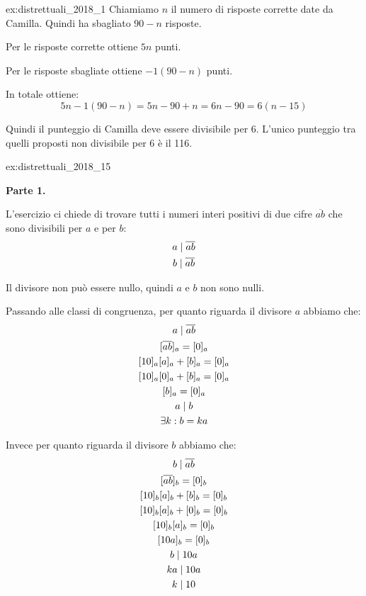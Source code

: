 \begin{soluzione}{ex:distrettuali_2018_1}
    Chiamiamo $n$ il numero di risposte corrette date da Camilla.
    Quindi ha sbagliato $90 - n$ risposte.

    Per le risposte corrette ottiene $5n$ punti.

    Per le risposte sbagliate ottiene $-1(90-n)$ punti.

    In totale ottiene:
    \[
        5n - 1(90 - n) = 5n - 90 + n = 6n - 90 = 6(n - 15)
    \]

    Quindi il punteggio di Camilla deve essere divisibile per 6.
    L'unico punteggio tra quelli proposti non divisibile per 6 è il 116.
\end{soluzione}

\begin{soluzione}{ex:distrettuali_2018_15}

    \textbf{Parte 1.}

    L'esercizio ci chiede di trovare tutti i numeri interi positivi di due cifre $\overline{ab}$ che sono divisibili
    per $a$ e per $b$:
    \begin{gather*}
        a  \mid  \overline{ab} \\
        b  \mid  \overline{ab}
    \end{gather*}

    Il divisore non può essere nullo, quindi $a$ e $b$ non sono nulli.

    Passando alle classi di congruenza, per quanto riguarda il divisore $a$ abbiamo che:
    \begin{gather*}
        a  \mid  \overline{ab} \\
        [\overline{ab}]_a = [0]_a \\
        [10]_a[a]_a + [b]_a = [0]_a \\
        [10]_a[0]_a + [b]_a = [0]_a \\
        [b]_a = [0]_a \\
        a  \mid  b \\
        \exists k : b = ka
    \end{gather*}

    Invece per quanto riguarda il divisore $b$ abbiamo che:
    \begin{gather*}
        b  \mid  \overline{ab} \\
        [\overline{ab}]_b = [0]_b \\
        [10]_b[a]_b + [b]_b = [0]_b \\
        [10]_b[a]_b + [0]_b = [0]_b \\
        [10]_b[a]_b = [0]_b \\
        [10a]_b = [0]_b \\
        b  \mid  10a \\
        ka  \mid  10a \\
        k  \mid  10
    \end{gather*}


\end{soluzione}
